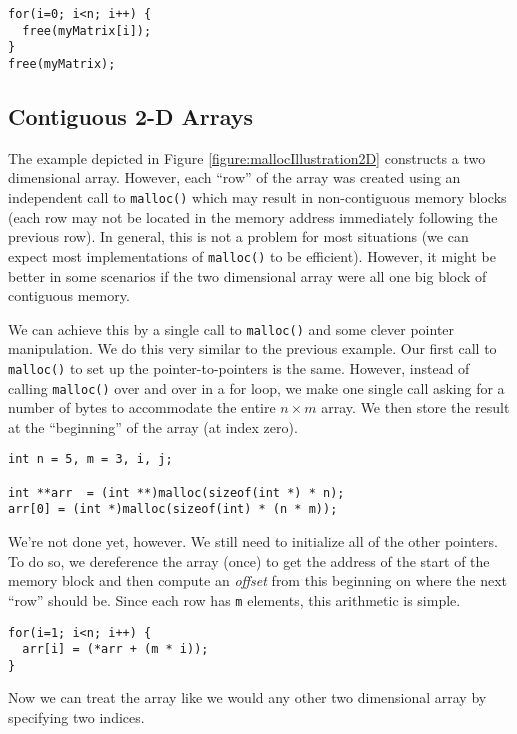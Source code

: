 \begin{verbatim}
for(i=0; i<n; i++) {
  free(myMatrix[i]);
}
free(myMatrix);
\end{verbatim}

\subsection{Contiguous 2-D Arrays}

The example depicted in Figure \ref{figure:mallocIllustration2D} 
constructs a two dimensional array.  However, each ``row'' of the
array was created using an independent call to \texttt{malloc()}
which may result in non-contiguous memory blocks (each row may not
be located in the memory address immediately following the previous
row).  In general, this is not a problem for most situations
(we can expect most implementations of \texttt{malloc()}
to be efficient).  However, it might be better in some scenarios if 
the two dimensional array were all one big block of contiguous memory.  

We can achieve this by a single call to \texttt{malloc()} and
some clever pointer manipulation.  We do this very similar to the
previous example.  Our first call to \texttt{malloc()} to set
up the pointer-to-pointers is the same.  However, instead of calling
\texttt{malloc()} over and over in a for loop, we make one
single call asking for a number of bytes to accommodate the entire
$n \times m$ array.  We then store the result at the ``beginning''
of the array (at index zero).

\begin{verbatim}
int n = 5, m = 3, i, j;

int **arr  = (int **)malloc(sizeof(int *) * n);
arr[0] = (int *)malloc(sizeof(int) * (n * m));
\end{verbatim}

We're not done yet, however.  We still need to initialize all of the
other pointers.  To do so, we dereference the array (once) to get
the address of the start of the memory block and then compute
an \emph{offset} from this beginning on where the next ``row'' should
be.  Since each row has \texttt{m} elements, this arithmetic
is simple.

\begin{verbatim}
for(i=1; i<n; i++) {
  arr[i] = (*arr + (m * i));
}
\end{verbatim}

Now we can treat the array like we would any other two dimensional array
by specifying two indices.

